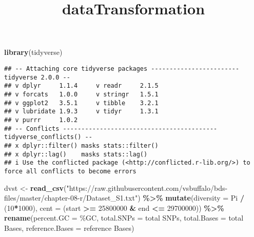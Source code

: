 \documentclass[
]{article}
\title{dataTransformation}
\author{}
\date{\vspace{-2.5em}}
\newenvironment{Shaded}{\begin{snugshade}}{\end{snugshade}}
\newcommand{\AttributeTok}[1]{\textcolor[rgb]{0.13,0.29,0.53}{#1}}
\newcommand{\DecValTok}[1]{\textcolor[rgb]{0.00,0.00,0.81}{#1}}
\newcommand{\FunctionTok}[1]{\textcolor[rgb]{0.13,0.29,0.53}{\textbf{#1}}}
\newcommand{\NormalTok}[1]{#1}
\newcommand{\OtherTok}[1]{\textcolor[rgb]{0.56,0.35,0.01}{#1}}
\newcommand{\SpecialCharTok}[1]{\textcolor[rgb]{0.81,0.36,0.00}{\textbf{#1}}}
\newcommand{\StringTok}[1]{\textcolor[rgb]{0.31,0.60,0.02}{#1}}
\begin{document}
\maketitle

\begin{Shaded}
\begin{Highlighting}[]
\FunctionTok{library}\NormalTok{(tidyverse)}
\end{Highlighting}
\end{Shaded}

\begin{verbatim}
## -- Attaching core tidyverse packages ------------------------ tidyverse 2.0.0 --
## v dplyr     1.1.4     v readr     2.1.5
## v forcats   1.0.0     v stringr   1.5.1
## v ggplot2   3.5.1     v tibble    3.2.1
## v lubridate 1.9.3     v tidyr     1.3.1
## v purrr     1.0.2     
## -- Conflicts ------------------------------------------ tidyverse_conflicts() --
## x dplyr::filter() masks stats::filter()
## x dplyr::lag()    masks stats::lag()
## i Use the conflicted package (<http://conflicted.r-lib.org/>) to force all conflicts to become errors
\end{verbatim}

\begin{Shaded}
\begin{Highlighting}[]
\NormalTok{dvst }\OtherTok{\textless{}{-}} \FunctionTok{read\_csv}\NormalTok{(}\StringTok{"https://raw.githubusercontent.com/vsbuffalo/bds{-}files/master/chapter{-}08{-}r/Dataset\_S1.txt"}\NormalTok{) }\SpecialCharTok{\%\textgreater{}\%} 
  \FunctionTok{mutate}\NormalTok{(}\AttributeTok{diversity =}\NormalTok{ Pi }\SpecialCharTok{/}\NormalTok{ (}\DecValTok{10}\SpecialCharTok{*}\DecValTok{1000}\NormalTok{), }\AttributeTok{cent =}\NormalTok{ (start }\SpecialCharTok{\textgreater{}=} \DecValTok{25800000} \SpecialCharTok{\&}\NormalTok{ end }\SpecialCharTok{\textless{}=} \DecValTok{29700000}\NormalTok{)) }\SpecialCharTok{\%\textgreater{}\%} 
  \FunctionTok{rename}\NormalTok{(}\AttributeTok{percent.GC =} \StringTok{\textasciigrave{}}\AttributeTok{\%GC}\StringTok{\textasciigrave{}}\NormalTok{, }\AttributeTok{total.SNPs =} \StringTok{\textasciigrave{}}\AttributeTok{total SNPs}\StringTok{\textasciigrave{}}\NormalTok{, }\AttributeTok{total.Bases =} \StringTok{\textasciigrave{}}\AttributeTok{total Bases}\StringTok{\textasciigrave{}}\NormalTok{, }\AttributeTok{reference.Bases =} \StringTok{\textasciigrave{}}\AttributeTok{reference Bases}\StringTok{\textasciigrave{}}\NormalTok{)}
\end{Highlighting}
\end{Shaded}
\end{document}
